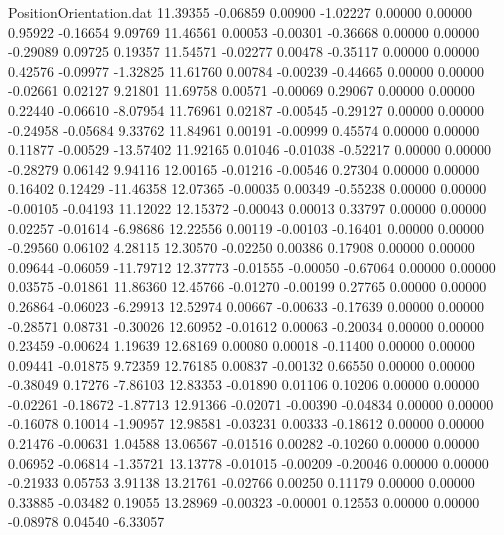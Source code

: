 \begin{filecontents}{PositionOrientation.dat}
  11.39355   -0.06859    0.00900    -1.02227    0.00000    0.00000    0.95922   -0.16654    9.09769
  11.46561    0.00053   -0.00301    -0.36668    0.00000    0.00000   -0.29089    0.09725    0.19357
  11.54571   -0.02277    0.00478    -0.35117    0.00000    0.00000    0.42576   -0.09977   -1.32825
  11.61760    0.00784   -0.00239    -0.44665    0.00000    0.00000   -0.02661    0.02127    9.21801
  11.69758    0.00571   -0.00069     0.29067    0.00000    0.00000    0.22440   -0.06610   -8.07954
  11.76961    0.02187   -0.00545    -0.29127    0.00000    0.00000   -0.24958   -0.05684    9.33762
  11.84961    0.00191   -0.00999     0.45574    0.00000    0.00000    0.11877   -0.00529  -13.57402
  11.92165    0.01046   -0.01038    -0.52217    0.00000    0.00000   -0.28279    0.06142    9.94116
  12.00165   -0.01216   -0.00546     0.27304    0.00000    0.00000    0.16402    0.12429  -11.46358
  12.07365   -0.00035    0.00349    -0.55238    0.00000    0.00000   -0.00105   -0.04193   11.12022
  12.15372   -0.00043    0.00013     0.33797    0.00000    0.00000    0.02257   -0.01614   -6.98686
  12.22556    0.00119   -0.00103    -0.16401    0.00000    0.00000   -0.29560    0.06102    4.28115
  12.30570   -0.02250    0.00386     0.17908    0.00000    0.00000    0.09644   -0.06059  -11.79712
  12.37773   -0.01555   -0.00050    -0.67064    0.00000    0.00000    0.03575   -0.01861   11.86360
  12.45766   -0.01270   -0.00199     0.27765    0.00000    0.00000    0.26864   -0.06023   -6.29913
  12.52974    0.00667   -0.00633    -0.17639    0.00000    0.00000   -0.28571    0.08731   -0.30026
  12.60952   -0.01612    0.00063    -0.20034    0.00000    0.00000    0.23459   -0.00624    1.19639
  12.68169    0.00080    0.00018    -0.11400    0.00000    0.00000    0.09441   -0.01875    9.72359
  12.76185    0.00837   -0.00132     0.66550    0.00000    0.00000   -0.38049    0.17276   -7.86103
  12.83353   -0.01890    0.01106     0.10206    0.00000    0.00000   -0.02261   -0.18672   -1.87713
  12.91366   -0.02071   -0.00390    -0.04834    0.00000    0.00000   -0.16078    0.10014   -1.90957
  12.98581   -0.03231    0.00333    -0.18612    0.00000    0.00000    0.21476   -0.00631    1.04588
  13.06567   -0.01516    0.00282    -0.10260    0.00000    0.00000    0.06952   -0.06814   -1.35721
  13.13778   -0.01015   -0.00209    -0.20046    0.00000    0.00000   -0.21933    0.05753    3.91138
  13.21761   -0.02766    0.00250     0.11179    0.00000    0.00000    0.33885   -0.03482    0.19055
  13.28969   -0.00323   -0.00001     0.12553    0.00000    0.00000   -0.08978    0.04540   -6.33057

\end{filecontents}
